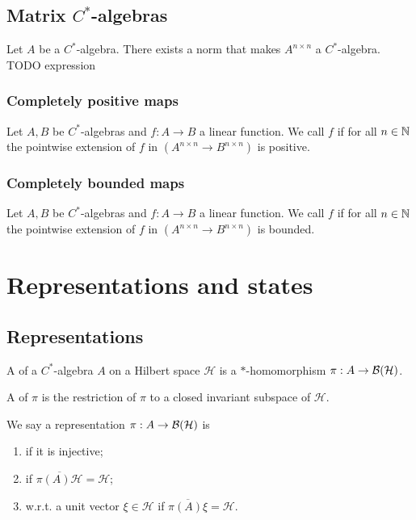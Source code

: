\section{Matrix $C^*$-algebras}
\begin{lemma}
Let $A$ be a $C^*$-algebra. There exists a norm that makes $A^{n\times n}$ a $C^*$-algebra. TODO expression
\end{lemma}
\subsection{Completely positive maps}
\begin{definition}
Let $A,B$ be $C^*$-algebras and $f:A\to B$ a linear function. We call $f$  if for all $n\in\mathbb{N}$ the pointwise extension of $f$ in $(A^{n\times n}\to B^{n\times n})$ is positive.
\end{definition}

\subsection{Completely bounded maps}
\begin{definition}
Let $A,B$ be $C^*$-algebras and $f:A\to B$ a linear function. We call $f$  if for all $n\in\mathbb{N}$ the pointwise extension of $f$ in $(A^{n\times n}\to B^{n\times n})$ is bounded.
\end{definition}


\chapter{Representations and states}
\section{Representations}
\begin{definition}
A  of a $C^*$-algebra $A$ on a Hilbert space $\mathcal{H}$ is a $*$-homomorphism $\pi: A \to \operatorname{\mathcal{B}}(\mathcal{H})$.

A  of $\pi$ is the restriction of $\pi$ to a closed invariant subspace of $\mathcal{H}$.

We say a representation $\pi: A \to \operatorname{\mathcal{B}}(\mathcal{H})$ is
\begin{enumerate}
\item {} if it is injective;
\item {} if $\overline{\pi(A)\mathcal{H}} = \mathcal{H}$;
\item {} w.r.t. a unit vector $\xi\in\mathcal{H}$ if $\overline{\pi(A)\xi} = \mathcal{H}$.
\end{enumerate}
\end{definition}

